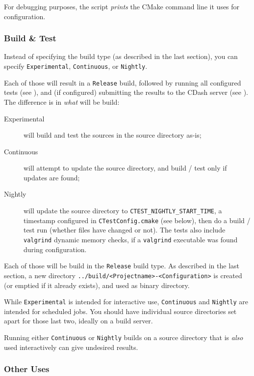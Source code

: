 For debugging purposes, the script \emph{prints} the CMake command line it uses for configuration.

\subsubsection{Build \& Test}

Instead of specifying the build type (as described in the last section), you can specify \lstinline{Experimental}, \lstinline{Continuous}, or \lstinline{Nightly}.

Each of those will result in a \lstinline{Release} build, followed by running all configured tests (see ), and (if configured) submitting the results to the CDash server (see ). The difference is in \emph{what} will be build:

\begin{description}
\item[Experimental] will build and test the sources in the source directory as-is;
\item[Continuous] will attempt to update the source directory, and build / test only if updates are found;
\item[Nightly] will update the source directory to \lstinline{CTEST_NIGHTLY_START_TIME}, a timestamp configured in \lstinline{CTestConfig.cmake} (see below), then do a build / test run (whether files have changed or not). The tests also include \lstinline{valgrind} dynamic memory checks, if a \lstinline{valgrind} executable was found during configuration.
\end{description}

Each of those will be build in the \lstinline{Release} build type. As described in the last section, a new directory \lstinline{../build/<Projectname>-<Configuration>} is created (or emptied if it already exists), and used as binary directory.

While \lstinline{Experimental} is intended for interactive use, \lstinline{Continuous} and \lstinline{Nightly} are intended for scheduled jobs. You should have individual source directories set apart for those last two, ideally on a build server.

Running either \lstinline{Continuous} or \lstinline{Nightly} builds on a source directory that is \emph{also} used interactively can give undesired results.

\subsubsection{Other Uses}

